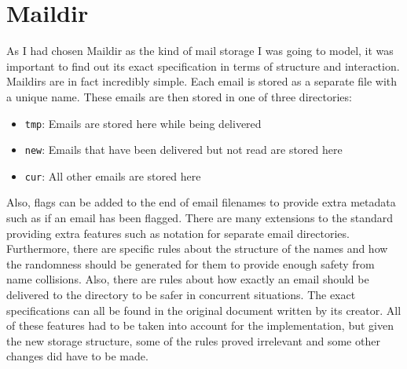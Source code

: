 \section{Maildir}

As I had chosen Maildir as the kind of mail storage I was going to model, it was important to find out its exact specification in terms of structure and interaction. Maildirs are in fact incredibly simple. Each email is stored as a separate file with a unique name. These emails are then stored in one of three directories:

\begin{itemize}
\item \texttt{tmp}: Emails are stored here while being delivered
\item \texttt{new}: Emails that have been delivered but not read are stored here
\item \texttt{cur}: All other emails are stored here
\end{itemize}

Also, flags can be added to the end of email filenames to provide extra metadata such as if an email has been flagged. There are many extensions to the standard providing extra features such as notation for separate email directories. Furthermore, there are specific rules about the structure of the names and how the randomness should be generated for them to provide enough safety from name collisions. Also, there are rules about how exactly an email should be delivered to the directory to be safer in concurrent situations. The exact specifications can all be found in the original document written by its creator\cite{bernstein2000maildir}. All of these features had to be taken into account for the implementation, but given the new storage structure, some of the rules proved irrelevant and some other changes did have to be made.

